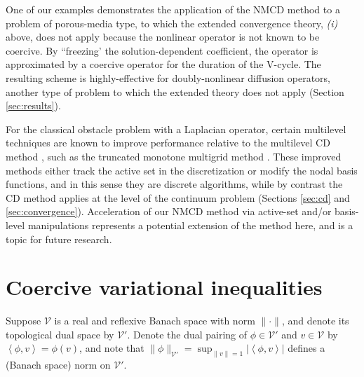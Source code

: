 \documentclass[letterpaper,final,12pt,reqno]{amsart}
\theoremstyle{cstyle}
\theoremstyle{cstyle*}
\theoremstyle{dstyle}
\numberwithin{equation}{section}
\numberwithin{figure}{section}
\numberwithin{table}{section}
\numberwithin{theorem}{section}
\newcommand{\cV}{\mathcal{V}}
\newcommand{\ip}[2]{\left<#1,#2\right>}
\begin{document}
One of our examples demonstrates the application of the NMCD method to a problem of porous-media type, to which the extended convergence theory, \emph{(i)} above, does not apply because the nonlinear operator is not known to be coercive.  By ``freezing' the solution-dependent coefficient, the operator is approximated by a coercive operator for the duration of the V-cycle.  The resulting scheme is highly-effective for doubly-nonlinear diffusion operators, another type of problem to which the extended theory does not apply (Section \ref{sec:results}).

For the classical obstacle problem with a Laplacian operator, certain multilevel techniques are known to improve performance relative to the multilevel CD method \cite{GraeserKornhuber2009}, such as the truncated monotone multigrid method \cite{Kornhuber1994}.  These improved methods either track the active set in the discretization or modify the nodal basis functions, and in this sense they are discrete algorithms, while by contrast the CD method applies at the level of the continuum problem (Sections \ref{sec:cd} and \ref{sec:convergence}).  Acceleration of our NMCD method via active-set and/or basis-level manipulations represents a potential extension of the method here, and is a topic for future research.



\section{Coercive variational inequalities} \label{sec:vi}

Suppose $\cV$ is a real and reflexive Banach space with norm $\|\cdot\|$, and denote its topological dual space by $\cV'$.  Denote the dual pairing of $\phi \in \cV'$ and $v\in\cV$ by $\ip{\phi}{v} = \phi(v)$, and note that $\|\phi\|_{\cV'} = \sup_{\|v\|=1} |\ip{\phi}{v}|$ defines a (Banach space) norm on $\cV'$.
\end{document}
